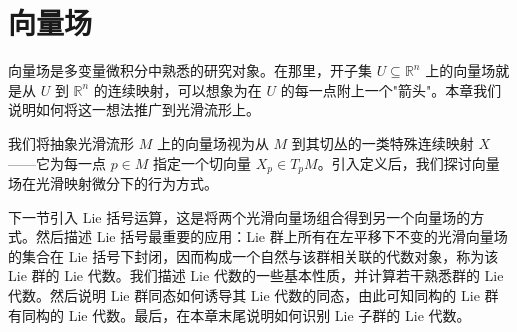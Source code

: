 \documentclass[../main.tex]{subfiles}
\begin{document}
\chapter{向量场}\label{chapter:ch08-向量场}

向量场是多变量微积分中熟悉的研究对象。在那里，开子集 $U\subseteq\mathbb{R}^n$ 上的向量场就是从 $U$ 到 $\mathbb{R}^n$ 的连续映射，可以想象为在 $U$ 的每一点附上一个"箭头"。本章我们说明如何将这一想法推广到光滑流形上。

我们将抽象光滑流形 $M$ 上的向量场视为从 $M$ 到其切丛的一类特殊连续映射 $X$——它为每一点 $p\in M$ 指定一个切向量 $X_p\in T_pM$。引入定义后，我们探讨向量场在光滑映射微分下的行为方式。

下一节引入 Lie 括号运算，这是将两个光滑向量场组合得到另一个向量场的方式。然后描述 Lie 括号最重要的应用：Lie 群上所有在左平移下不变的光滑向量场的集合在 Lie 括号下封闭，因而构成一个自然与该群相关联的代数对象，称为该 Lie 群的 Lie 代数。我们描述 Lie 代数的一些基本性质，并计算若干熟悉群的 Lie 代数。然后说明 Lie 群同态如何诱导其 Lie 代数的同态，由此可知同构的 Lie 群有同构的 Lie 代数。最后，在本章末尾说明如何识别 Lie 子群的 Lie 代数。






\end{document}
